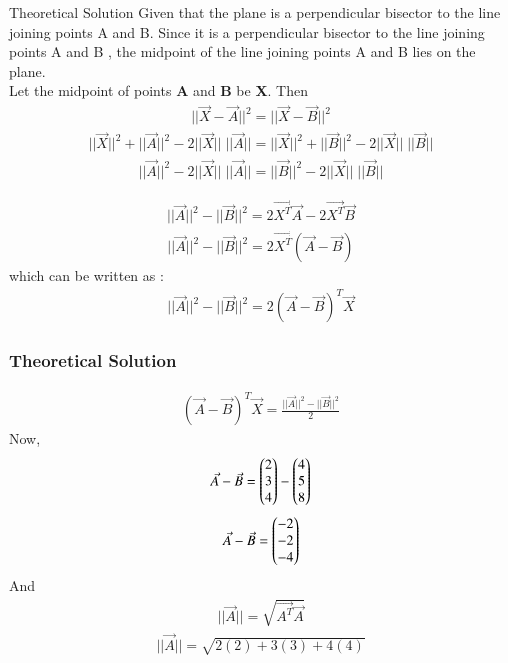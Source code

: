 \documentclass{beamer}
\begin{document}
\begin{frame}{Theoretical Solution}
Given that the plane is a perpendicular bisector to the line joining points A and B. Since it is a perpendicular bisector to the line joining points A and B , the midpoint of the line joining points A and B lies on the plane.\\
Let the midpoint of points \textbf{A} and \textbf{B} be \textbf{X}. Then
\begin{align}
||\Vec{X}-\Vec{A}||^2=||\Vec{X}-\Vec{B}||^2
\end{align}
\begin{align}
    ||\Vec{X}||^2+||\Vec{A}||^2-2||\Vec{X}||\;||\Vec{A}||= ||\Vec{X}||^2+||\Vec{B}||^2-2||\Vec{X}||\;||\Vec{B}||
\end{align}
\begin{align}
    ||\Vec{A}||^2-2||\Vec{X}||\;||\Vec{A}||=||\Vec{B}||^2-2||\Vec{X}||\;||\Vec{B}||
\end{align}

\begin{align}
   ||\Vec{A}||^2-||\Vec{B}||^2=2\Vec{X^T}\Vec{A}-2\Vec{X^T}\Vec{B}
\end{align}
\begin{align}
    ||\Vec{A}||^2-||\Vec{B}||^2=2\Vec{X^T}(\Vec{A}-\Vec{B})
\end{align}
which can be written as :
\begin{align}
    ||\Vec{A}||^2-||\Vec{B}||^2=2(\Vec{A}-\Vec{B})^T\Vec{X}
\end{align}



\end{frame}
\begin{frame}
\frametitle{Theoretical Solution}
\begin{align}
 (\Vec{A}-\Vec{B})^T\Vec{X}=\frac{||\Vec{A}||^2-||\Vec{B}||^2}{2}
\end{align}
Now,
\begin{align}
    \Vec{A}-\Vec{B}=\begin{pmatrix}2\\3\\4\end{pmatrix}-\begin{pmatrix}4\\5\\8\end{pmatrix}
\end{align}
\begin{align}
   \Vec{A}-\Vec{B}=\begin{pmatrix}-2\\-2\\-4\end{pmatrix}
\end{align}
And
\begin{align}
     ||\Vec{A}||=\sqrt{\Vec{A^T}\Vec{A}}
\end{align}
\begin{align}
    ||\Vec{A}||=\sqrt{2(2)+3(3)+4(4)}
\end{align}
\end{frame}
\end{document}
